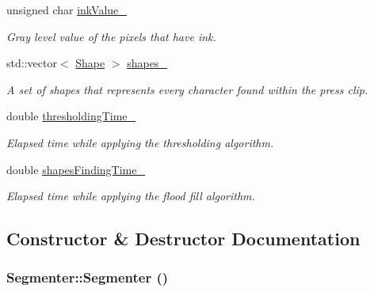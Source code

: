 \begin{CompactItemize}
\item 
\hypertarget{class_segmenter_fa6183f99aa6011399783652b341a43b}{
unsigned char \hyperlink{class_segmenter_fa6183f99aa6011399783652b341a43b}{inkValue\_\-}}
\label{class_segmenter_fa6183f99aa6011399783652b341a43b}

\begin{CompactList}\small\item\em Gray level value of the pixels that have ink. \item\end{CompactList}\item 
\hypertarget{class_segmenter_3040cc000907ef44e820ddcf70de6f08}{
std::vector$<$ \hyperlink{class_shape}{Shape} $>$ \hyperlink{class_segmenter_3040cc000907ef44e820ddcf70de6f08}{shapes\_\-}}
\label{class_segmenter_3040cc000907ef44e820ddcf70de6f08}

\begin{CompactList}\small\item\em A set of shapes that represents every character found within the press clip. \item\end{CompactList}\item 
\hypertarget{class_segmenter_13c768c0dfa734bb6ca0c548511bc7bb}{
double \hyperlink{class_segmenter_13c768c0dfa734bb6ca0c548511bc7bb}{thresholdingTime\_\-}}
\label{class_segmenter_13c768c0dfa734bb6ca0c548511bc7bb}

\begin{CompactList}\small\item\em Elapsed time while applying the thresholding algorithm. \item\end{CompactList}\item 
\hypertarget{class_segmenter_ebe750333b882a982362ac18114ce915}{
double \hyperlink{class_segmenter_ebe750333b882a982362ac18114ce915}{shapesFindingTime\_\-}}
\label{class_segmenter_ebe750333b882a982362ac18114ce915}

\begin{CompactList}\small\item\em Elapsed time while applying the flood fill algorithm. \item\end{CompactList}\end{CompactItemize}


\subsection{Constructor \& Destructor Documentation}
\hypertarget{class_segmenter_d39ec3bda31be180820aa0bdca7b125d}{
\subsubsection[Segmenter]{\setlength{\rightskip}{0pt plus 5cm}Segmenter::Segmenter ()}}
\label{class_segmenter_d39ec3bda31be180820aa0bdca7b125d}


